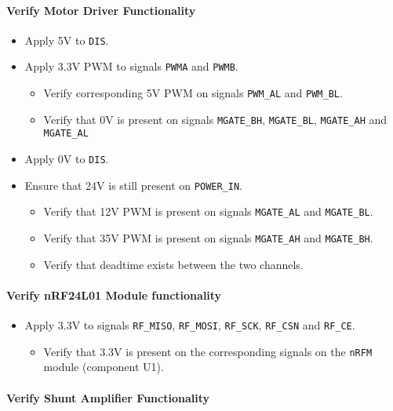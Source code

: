 \paragraph{Verify Motor Driver Functionality} %
\begin{itemize}
	\item Apply 5V to \texttt{DIS}.
	\item Apply 3.3V PWM to signals \texttt{PWMA} and \texttt{PWMB}.
	\begin{itemize}
		\item Verify corresponding 5V PWM on signals \texttt{PWM\_AL} and \texttt{PWM\_BL}.
		\item Verify that 0V is present on signals \texttt{MGATE\_BH}, \texttt{MGATE\_BL}, \texttt{MGATE\_AH} and \texttt{MGATE\_AL}
	\end{itemize}
	\item Apply 0V to \texttt{DIS}.
	\item Ensure that 24V is still present on \texttt{POWER\_IN}.
	\begin{itemize}
		\item Verify that 12V PWM is present on signals \texttt{MGATE\_AL} and \texttt{MGATE\_BL}.
		\item Verify that 35V PWM is present on signals \texttt{MGATE\_AH} and \texttt{MGATE\_BH}.
		\item Verify that deadtime exists between the two channels.
	\end{itemize}
\end{itemize}
\paragraph{Verify nRF24L01 Module functionality} %
\begin{itemize}
	\item Apply 3.3V to signals \texttt{RF\_MISO}, \texttt{RF\_MOSI}, \texttt{RF\_SCK}, \texttt{RF\_CSN} and \texttt{RF\_CE}.
	\begin{itemize}
		\item Verify that 3.3V is present on the corresponding signals on the \texttt{nRFM} module (component U1).
	\end{itemize}
\end{itemize}

\paragraph{Verify Shunt Amplifier Functionality} %
\label{par:verify_shunt_amplifier_functionality}
